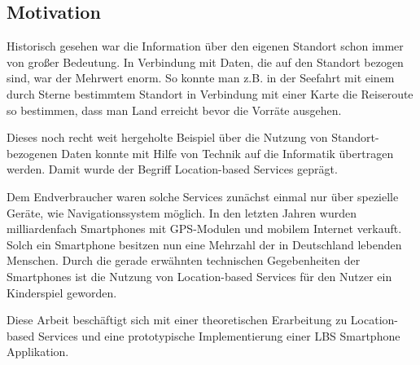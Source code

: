 \subsection{Motivation}

Historisch gesehen war die Information über den eigenen Standort schon immer von großer Bedeutung. In Verbindung mit Daten, die auf den Standort bezogen sind, war der Mehrwert enorm. So konnte man z.B. in der Seefahrt mit einem durch Sterne bestimmtem Standort in Verbindung mit einer Karte die Reiseroute so bestimmen, dass man Land erreicht bevor die Vorräte ausgehen.

Dieses noch recht weit hergeholte Beispiel über die Nutzung von Standort-bezogenen Daten konnte mit Hilfe von Technik auf die Informatik übertragen werden. Damit wurde der Begriff Location-based Services geprägt. 

Dem Endverbraucher waren solche Services zunächst einmal nur über spezielle Geräte, wie Navigationssystem möglich. In den letzten Jahren wurden milliardenfach Smartphones mit GPS-Modulen und mobilem Internet verkauft. Solch ein Smartphone besitzen nun eine Mehrzahl der in Deutschland lebenden Menschen. \cite{bitkom} Durch die gerade erwähnten technischen Gegebenheiten der Smartphones ist die Nutzung von Location-based Services für den Nutzer ein Kinderspiel geworden. 

Diese Arbeit beschäftigt sich mit einer theoretischen Erarbeitung zu Location-based Services und eine prototypische Implementierung einer LBS Smartphone Applikation.

\newpage